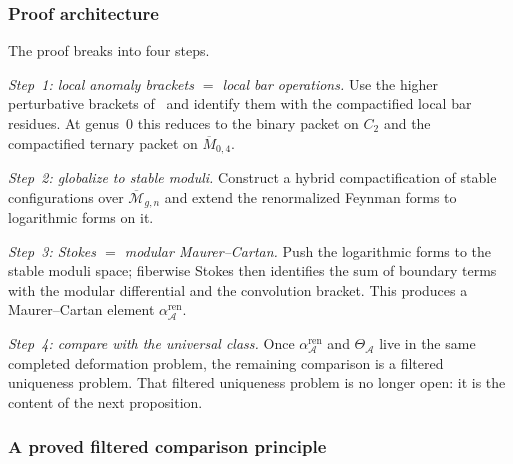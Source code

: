 \subsubsection*{Proof architecture}

The proof breaks into four steps.

\emph{Step~1: local anomaly brackets $=$ local bar operations.}
Use the higher perturbative brackets of~\cite{GKW24} and identify them with
the compactified local bar residues.
At genus~$0$ this reduces to the binary packet on $C_2$ and the compactified
ternary packet on $\overline M_{0,4}$.

\emph{Step~2: globalize to stable moduli.}
Construct a hybrid compactification of stable configurations over
$\overline{\mathcal M}_{g,n}$ and extend the renormalized Feynman forms to
logarithmic forms on it.

\emph{Step~3: Stokes $=$ modular Maurer--Cartan.}
Push the logarithmic forms to the stable moduli space; fiberwise Stokes then
identifies the sum of boundary terms with the modular differential and the
convolution bracket.
This produces a Maurer--Cartan element
$\alpha^{\mathrm{ren}}_{\mathcal A}$.

\emph{Step~4: compare with the universal class.}
Once $\alpha^{\mathrm{ren}}_{\mathcal A}$ and $\Theta_{\mathcal A}$ live in
the same completed deformation problem, the remaining comparison is a
filtered uniqueness problem.
That filtered uniqueness problem is no longer open: it is the content of the
next proposition.

\subsubsection*{A proved filtered comparison principle}

